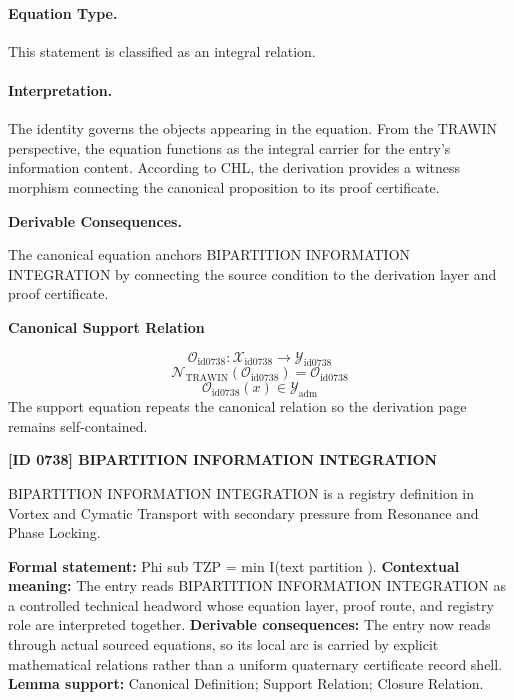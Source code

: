 \paragraph{Equation Type.}
This statement is classified as an integral relation.

\paragraph{Interpretation.}
The identity governs the objects appearing in the equation. From the TRAWIN perspective, the equation functions as the integral carrier for the entry’s information content. According to CHL, the derivation provides a witness morphism connecting the canonical proposition to its proof certificate.

\par\vspace{0.35em}
\noindent\textbf{Derivable Consequences.}\quad
\begingroup
\footnotesize
\raggedright
The canonical equation anchors BIPARTITION INFORMATION INTEGRATION by connecting the source condition to the derivation layer and proof certificate.
\par\endgroup

\noindent\textbf{Canonical Support Relation}\par
\[
\mathcal{O}_{\mathrm{id0738}}:\mathcal{X}_{\mathrm{id0738}}\longrightarrow\mathcal{Y}_{\mathrm{id0738}}
\]
\[
\mathcal{N}_{\mathrm{TRAWIN}}(\mathcal{O}_{\mathrm{id0738}})=\mathcal{O}_{\mathrm{id0738}}
\]
\[
\mathcal{O}_{\mathrm{id0738}}(x)\in\mathcal{Y}_{\mathrm{adm}}
\]
\noindent The support equation repeats the canonical relation so the derivation page remains self-contained.\par

\clearpage
\noindent\textbf{[ID 0738] BIPARTITION INFORMATION INTEGRATION}\par
\vspace{0.35em}
\begingroup\small
{}
BIPARTITION INFORMATION INTEGRATION is a registry definition in Vortex and Cymatic Transport with secondary pressure from Resonance and Phase Locking.

\begingroup\footnotesize\setlength{\emergencystretch}{3em}\sloppy
\textbf{Formal statement:} Phi sub TZP = min I(text partition ). \textbf{Contextual meaning:} The entry reads BIPARTITION INFORMATION INTEGRATION as a controlled technical headword whose equation layer, proof route, and registry role are interpreted together. \textbf{Derivable consequences:} The entry now reads through actual sourced equations, so its local arc is carried by explicit mathematical relations rather than a uniform quaternary certificate record shell. \textbf{Lemma support:} Canonical Definition; Support Relation; Closure Relation.\par
\endgroup

